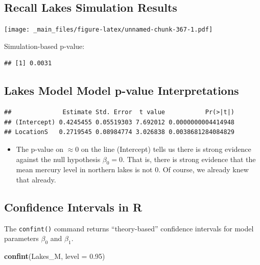 \documentclass[]{book}
\newenvironment{Shaded}{\begin{snugshade}}{\end{snugshade}}
\newcommand{\KeywordTok}[1]{\textcolor[rgb]{0.13,0.29,0.53}{\textbf{#1}}}
\newcommand{\DataTypeTok}[1]{\textcolor[rgb]{0.13,0.29,0.53}{#1}}
\newcommand{\FloatTok}[1]{\textcolor[rgb]{0.00,0.00,0.81}{#1}}
\newcommand{\OperatorTok}[1]{\textcolor[rgb]{0.81,0.36,0.00}{\textbf{#1}}}
\newcommand{\NormalTok}[1]{#1}
\providecommand{\tightlist}{%
  \setlength{\itemsep}{0pt}\setlength{\parskip}{0pt}}
\begin{document}
\subsection{Recall Lakes Simulation
Results}\label{recall-lakes-simulation-results}

\texttt{[image: \_main\_files/figure-latex/unnamed-chunk-367-1.pdf]}

Simulation-based p-value:

\begin{verbatim}
## [1] 0.0031
\end{verbatim}

\subsection{Lakes Model Model p-value
Interpretations}\label{lakes-model-model-p-value-interpretations-1}

\begin{Shaded}
\end{Shaded}

\begin{verbatim}
##              Estimate Std. Error  t value           Pr(>|t|)
## (Intercept) 0.4245455 0.05519303 7.692012 0.0000000004414948
## LocationS   0.2719545 0.08984774 3.026838 0.0038681284084829
\end{verbatim}

\begin{itemize}
\tightlist
\item
  The p-value on \(\approx 0\) on the line (Intercept) tells us there is
  strong evidence against the null hypothesis \(\beta_0=0\). That is,
  there is strong evidence that the mean mercury level in northern lakes
  is not 0. Of course, we already knew that already.
\end{itemize}

\subsection{Confidence Intervals in R}\label{confidence-intervals-in-r}

The \texttt{confint()} command returns ``theory-based'' confidence
intervals for model parameters \(\beta_0\) and \(\beta_1\).

\begin{Shaded}
\begin{Highlighting}[]
\KeywordTok{confint}\NormalTok{(Lakes_M, }\DataTypeTok{level =} \FloatTok{0.95}\NormalTok{)}
\end{Highlighting}
\end{Shaded}
\end{document}
